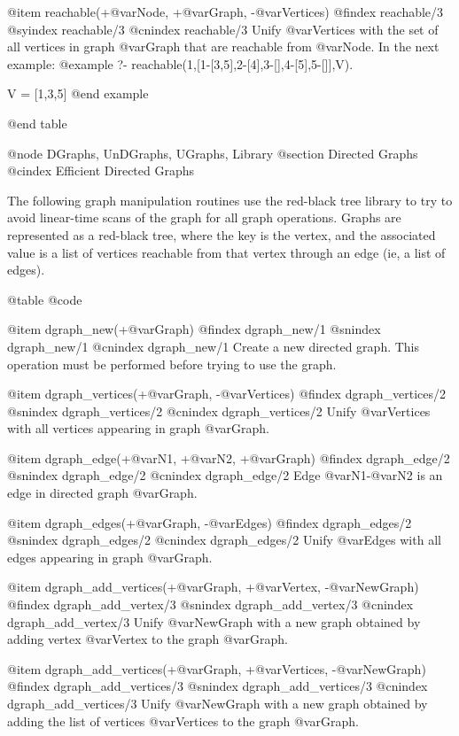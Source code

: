 {{{{{{{{{@item reachable(+@var{Node}, +@var{Graph}, -@var{Vertices})
@findex  reachable/3
@syindex reachable/3
@cnindex reachable/3
Unify @var{Vertices} with the set of all vertices in graph
@var{Graph} that are reachable from @var{Node}. In the next example:
@example
?- reachable(1,[1-[3,5],2-[4],3-[],4-[5],5-[]],V).

V = [1,3,5]
@end example

@end table

@node DGraphs, UnDGraphs, UGraphs, Library
@section Directed Graphs
@cindex Efficient Directed Graphs

The following graph manipulation routines use the red-black tree library
to try to avoid linear-time scans of the graph for all graph
operations. Graphs are represented as a red-black tree, where the key is
the vertex, and the associated value is a list of vertices reachable
from that vertex through an edge (ie, a list of edges). 

@table @code

@item dgraph_new(+@var{Graph})
@findex  dgraph_new/1
@snindex dgraph_new/1
@cnindex dgraph_new/1
Create a new directed graph. This operation must be performed before
trying to use the graph.

@item dgraph_vertices(+@var{Graph}, -@var{Vertices})
@findex  dgraph_vertices/2
@snindex dgraph_vertices/2
@cnindex dgraph_vertices/2
Unify @var{Vertices} with all vertices appearing in graph
@var{Graph}.

@item dgraph_edge(+@var{N1}, +@var{N2}, +@var{Graph})
@findex  dgraph_edge/2
@snindex dgraph_edge/2
@cnindex dgraph_edge/2
Edge @var{N1}-@var{N2} is an edge in directed graph @var{Graph}.

@item dgraph_edges(+@var{Graph}, -@var{Edges})
@findex  dgraph_edges/2
@snindex dgraph_edges/2
@cnindex dgraph_edges/2
Unify @var{Edges} with all edges appearing in graph
@var{Graph}.

@item dgraph_add_vertices(+@var{Graph}, +@var{Vertex}, -@var{NewGraph})
@findex  dgraph_add_vertex/3
@snindex dgraph_add_vertex/3
@cnindex dgraph_add_vertex/3
Unify @var{NewGraph} with a new graph obtained by adding
vertex @var{Vertex} to the graph @var{Graph}.

@item dgraph_add_vertices(+@var{Graph}, +@var{Vertices}, -@var{NewGraph})
@findex  dgraph_add_vertices/3
@snindex dgraph_add_vertices/3
@cnindex dgraph_add_vertices/3
Unify @var{NewGraph} with a new graph obtained by adding the list of
vertices @var{Vertices} to the graph @var{Graph}.

}}}}}}}}}
